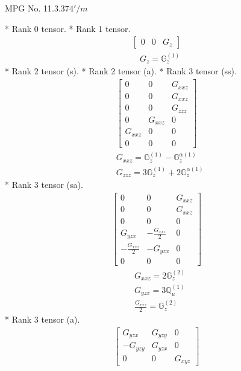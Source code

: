 \documentclass[fleqn,8pt,landscape]{jsarticle}
\begin{document}
\setcounter{MaxMatrixCols}{32}

\renewcommand{\tablename}{Table~}
\renewcommand{\figurename}{Figure~}
\begin{center}
\LARGE
MPG No. 11.3.37\quad$4'/m$
\end{center}
* Rank 0 tensor.
* Rank 1 tensor.
\begin{align*}
\begin{bmatrix} 0 & 0 & G_{z} \end{bmatrix}
\end{align*}
\begin{align*}
& G_{z} = \mathbb{G}_{z}^{(1)}
\end{align*}
* Rank 2 tensor (s).
* Rank 2 tensor (a).
* Rank 3 tensor (ss).
\begin{align*}
\begin{bmatrix} 0 & 0 & G_{xxz} \\ 0 & 0 & G_{xxz} \\ 0 & 0 & G_{zzz} \\ 0 & G_{xxz} & 0 \\ G_{xxz} & 0 & 0 \\ 0 & 0 & 0 \end{bmatrix}
\end{align*}
\begin{align*}
& G_{xxz} = \mathbb{G}_{z}^{(1)} - \mathbb{G}_{z}^{\alpha(1)} \\
& G_{zzz} = 3 \mathbb{G}_{z}^{(1)} + 2 \mathbb{G}_{z}^{\alpha(1)}
\end{align*}
* Rank 3 tensor (sa).
\begin{align*}
\begin{bmatrix} 0 & 0 & G_{xxz} \\ 0 & 0 & G_{xxz} \\ 0 & 0 & 0 \\ G_{yzx} & - \frac{G_{xxz}}{2} & 0 \\ - \frac{G_{xxz}}{2} & - G_{yzx} & 0 \\ 0 & 0 & 0 \end{bmatrix}
\end{align*}
\begin{align*}
& G_{xxz} = 2 \mathbb{G}_{z}^{(2)} \\
& G_{yzx} = 3 \mathbb{Q}_{u}^{(1)} \\
& \frac{G_{xxz}}{2} = \mathbb{G}_{z}^{(2)}
\end{align*}
* Rank 3 tensor (a).
\begin{align*}
\begin{bmatrix} G_{yzx} & G_{yzy} & 0 \\ - G_{yzy} & G_{yzx} & 0 \\ 0 & 0 & G_{xyz} \end{bmatrix}
\end{align*}
\end{document}
